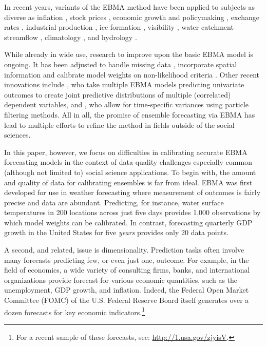 \documentclass[12pt,fullpage,endnotes]{article}
\begin{document}
In recent years, variants of the EBMA method have been applied to
subjects as diverse as inflation \citep{Wright:2009, Koop:2010,
  Gneiting:2010}, stock prices \citep{Billio:2011}, economic growth
and policymaking \citep{Brock:2007, Billio:2010}, exchange rates
\citep{Wright:2008}, industrial production \citep{Feldkircher:2010},
ice formation \citep{Berrocal:2010}, visibility
\citep{Chmielecki:2010}, water catchment streamflow
\citep{Viney:2009}, climatology \citep{Min:2006, Min:2007,
  Smith:2009}, and hydrology \citep{Zhang:2009}.  

While already in wide use, research to improve upon the basic EBMA
model is ongoing. It has been adjusted to handle missing data
\citep{Fraley:2010, Mccandless:2011}, incorporate spatial information
\citep{Feldman:2012} and calibrate model weights on non-likelihood
criteria \citep[e.g.,][]{Vrugt:2006}.  Other recent innovations
include \citet{MoellerEtAl:2012}, who take multiple EBMA models
predicting univariate outcomes to create joint predictive
distributions of multiple (correlated) dependent variables, and
\citet{RingsEtAl:2012}, who allow for time-specific variances using
particle filtering methods.  All in all, the promise of ensemble
forecasting via EBMA has lead to multiple efforts to refine the method
in fields outside of the social sciences.

In this paper, however, we focus on difficulties in calibrating
accurate EBMA forecasting models in the context of data-quality
challenges especially common (although not limited to) social science
applications.  To begin with, the amount and quality of data for
calibrating ensembles is far from ideal. EBMA was first developed for
use in weather forecasting where measurement of outcomes is fairly
precise and data are abundant. Predicting, for instance, water surface
temperatures in 200 locations across just five days provides 1,000
observations by which model weights can be calibrated. In contrast,
forecasting quarterly GDP growth in the United States for five
\textit{years} provides only 20 data points.

A second, and related, issue is dimensionality. Prediction tasks often
involve many forecasts predicting few, or even just one, outcome.  For
example, in the field of economics, a wide variety of consulting
firms, banks, and international organizations provide forecast for
various economic quantities, such as the unemployment, GDP growth, and
inflation.  Indeed, the Federal Open Market Committee (FOMC) of the
U.S. Federal Reserve Board itself generates over a dozen forecasts for
key economic indicators.\footnote{For a recent sample of these
  forecasts, see: \url{http://1.usa.gov/zjyisV}.}
\end{document}
